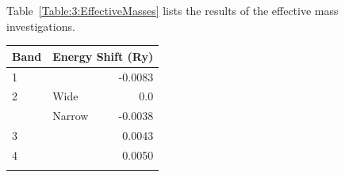 Table~\ref{Table:3:EffectiveMasses} lists the results of the effective mass investigations.
\medskip
\begin{center}
    \begin{tabular}[h!]{llr}
\toprule
Band    & \multicolumn{2}{l}{Energy Shift (\unit{Ry})} \\
\midrule
1       &       & -0.0083      \\
2       & Wide  & 0.0          \\
        & Narrow & -0.0038     \\
3       &       & 0.0043       \\
4       &       & 0.0050        \\
\bottomrule
    \label{Table:3:EnergyShifts}
    \end{tabular}
\end{center}


